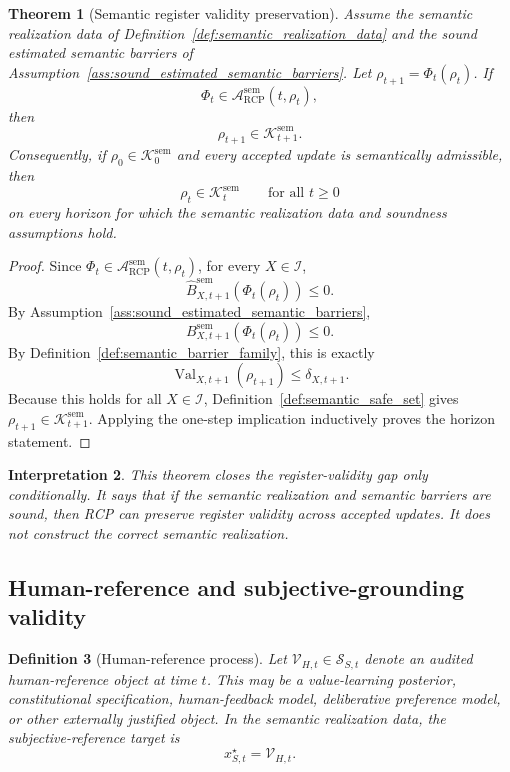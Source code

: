 \documentclass[11pt]{article}
\newtheorem{theorem}{Theorem}[section]
\newtheorem{definition}[theorem]{Definition}
\newtheorem{interpretation}[theorem]{Interpretation}
\newcommand{\Acal}{\mathcal{A}}
\newcommand{\1}{\mathbf{1}}
\newcommand{\RCP}{\mathrm{RCP}}
\newcommand{\Val}{\operatorname{Val}}
\providecommand{\Ical}{\mathcal{I}}
\providecommand{\Kcal}{\mathcal{K}}
\providecommand{\Scal}{\mathcal{S}}
\providecommand{\Vcal}{\mathcal{V}}
\providecommand{\sem}{\mathrm{sem}}
\begin{document}
\begin{theorem}[Semantic register validity preservation]
\label{thm:semantic_register_preservation}
Assume the semantic realization data of Definition~\ref{def:semantic_realization_data} and the sound estimated semantic barriers of Assumption~\ref{ass:sound_estimated_semantic_barriers}.  Let \(\rho_{t+1}=\Phi_t(\rho_t)\).  If
\[
\Phi_t\in\Acal^{\sem}_{\RCP}(t,\rho_t),
\]
then
\[
\rho_{t+1}\in\Kcal_{t+1}^{\sem}.
\]
Consequently, if \(\rho_0\in\Kcal_0^{\sem}\) and every accepted update is semantically admissible, then
\[
\rho_t\in\Kcal_t^{\sem}
\qquad\text{for all }t\ge0
\]
on every horizon for which the semantic realization data and soundness assumptions hold.
\end{theorem}

\begin{proof}
Since \(\Phi_t\in\Acal^{\sem}_{\RCP}(t,\rho_t)\), for every \(X\in\Ical\),
\[
\widehat B^{\sem}_{X,t+1}(\Phi_t(\rho_t))\le0.
\]
By Assumption~\ref{ass:sound_estimated_semantic_barriers},
\[
B^{\sem}_{X,t+1}(\Phi_t(\rho_t))\le0.
\]
By Definition~\ref{def:semantic_barrier_family}, this is exactly
\[
\Val_{X,t+1}(\rho_{t+1})\le\delta_{X,t+1}.
\]
Because this holds for all \(X\in\Ical\), Definition~\ref{def:semantic_safe_set} gives \(\rho_{t+1}\in\Kcal_{t+1}^{\sem}\).  Applying the one-step implication inductively proves the horizon statement.
\end{proof}

\begin{interpretation}
This theorem closes the register-validity gap only conditionally.  It says that if the semantic realization and semantic barriers are sound, then RCP can preserve register validity across accepted updates.  It does not construct the correct semantic realization.
\end{interpretation}

\subsection{Human-reference and subjective-grounding validity}

\begin{definition}[Human-reference process]
\label{def:human_reference_process}
Let \(\Vcal_{H,t}\in\Scal_{S,t}\) denote an audited human-reference object at time \(t\).  This may be a value-learning posterior, constitutional specification, human-feedback model, deliberative preference model, or other externally justified object.  In the semantic realization data, the subjective-reference target is
\[
x^{\star}_{S,t}=\Vcal_{H,t}.
\]
\end{definition}
\end{document}
